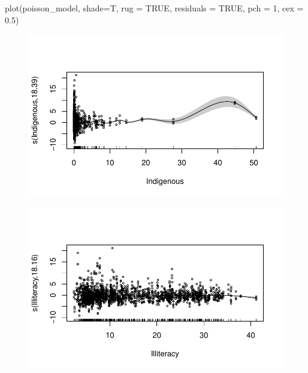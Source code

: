 \documentclass[
  letterpaper,
  DIV=11,
  numbers=noendperiod]{scrartcl}
\newenvironment{Shaded}{\begin{snugshade}}{\end{snugshade}}
\newcommand{\AttributeTok}[1]{\textcolor[rgb]{0.40,0.45,0.13}{#1}}
\newcommand{\ConstantTok}[1]{\textcolor[rgb]{0.56,0.35,0.01}{#1}}
\newcommand{\DecValTok}[1]{\textcolor[rgb]{0.68,0.00,0.00}{#1}}
\newcommand{\FloatTok}[1]{\textcolor[rgb]{0.68,0.00,0.00}{#1}}
\newcommand{\FunctionTok}[1]{\textcolor[rgb]{0.28,0.35,0.67}{#1}}
\newcommand{\NormalTok}[1]{\textcolor[rgb]{0.00,0.23,0.31}{#1}}
\begin{document}
\begin{Shaded}
\begin{Highlighting}[]
\FunctionTok{plot}\NormalTok{(poisson\_model, }\AttributeTok{shade=}\NormalTok{T, }\AttributeTok{rug =} \ConstantTok{TRUE}\NormalTok{, }\AttributeTok{residuals =} \ConstantTok{TRUE}\NormalTok{,}
\AttributeTok{pch =} \DecValTok{1}\NormalTok{, }\AttributeTok{cex =} \FloatTok{0.5}\NormalTok{)}
\end{Highlighting}
\end{Shaded}

\begin{figure}[H]

{\centering \includegraphics{Group34Coursework_files/figure-pdf/unnamed-chunk-10-1.pdf}

}

\end{figure}

\begin{figure}[H]

{\centering \includegraphics{Group34Coursework_files/figure-pdf/unnamed-chunk-10-2.pdf}

}

\end{figure}
\end{document}
